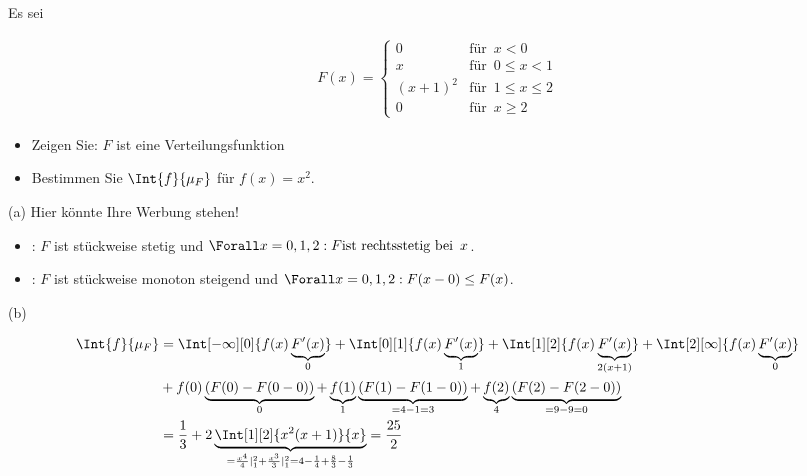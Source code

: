 \begin{exercise}

Es sei

\begin{align*}
  F(x) =
  \begin{cases}
    0         & \text{für} \enspace x < 0 \\
    x         & \text{für} \enspace 0 \leq x < 1 \\
    (x + 1)^2 & \text{für} \enspace 1 \leq x \leq 2 \\
    0         & \text{für} \enspace x \geq 2
  \end{cases}
\end{align*}

\begin{itemize}
  \item[(a)] Zeigen Sie: $F$ ist eine Verteilungsfunktion
  \item[(b)] Bestimmen Sie $\Int{f}{\mu_F}$ für $f(x) = x^2$.
\end{itemize}

\end{exercise}


\begin{solution}

(a) Hier könnte Ihre Werbung stehen!

\begin{itemize}

  \item {}: $F$ ist stückweise stetig und $\Forall x = 0, 1, 2: F \text{ist rechtsstetig bei} \enspace x$.

  \item {}: $F$ ist stückweise monoton steigend und $\Forall x = 0, 1, 2: F(x - 0) \leq F(x)$.

\end{itemize}

(b)

\begin{align*}
  \Int{f}{\mu_F}
  & =
  \Int[-\infty][0]{f(x) \underbrace{F^\prime(x)}_0}
  +
  \Int[0][1]{f(x) \underbrace{F^\prime(x)}_1}
  +
  \Int[1][2]{f(x) \underbrace{F^\prime(x)}_{2 (x+1)}}
  +
  \Int[2][\infty]{f(x) \underbrace{F^\prime(x)}_0} \\
  & +
  f(0) \underbrace{(F(0) - F(0 - 0))}_0
  +
  \underbrace{f(1)}_1 \underbrace{(F(1) - F(1 - 0))}_{= 4-1 = 3}
  +
  \underbrace{f(2)}_4 \underbrace{(F(2) - F(2 - 0))}_{= 9-9 = 0} \\
  & =
  \frac{1}{3}
  +
  2 \underbrace
  {
    \Int[1][2]{x^2 (x + 1)}{x}
  }_{
    = \frac{x^4}{4} |_1^2 + \frac{x^3}{3} |_1^2
    = 4 - \frac{1}{4} + \frac{8}{3} - \frac{1}{3}
  }
  =
  \frac{25}{2}
\end{align*}

\end{solution}
